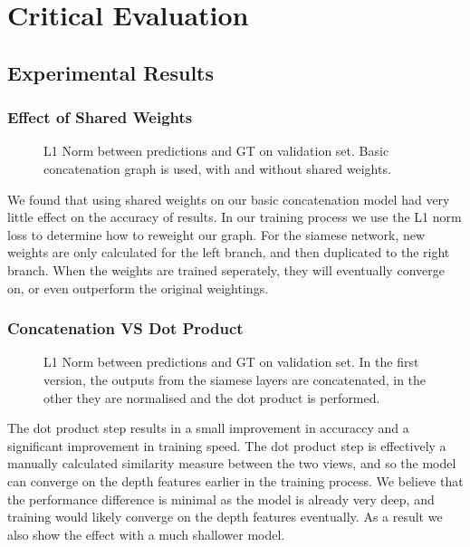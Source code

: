 \documentclass[ %
                    author={Gavin Parker},
                supervisor={Dr. Neill Campbell},
                    degree={MEng},
                     title={Deep Siamese Networks for Illumination Estimation from Stereo Images},
                  subtitle={},
                      type={research},
                      year={2018} ]{dissertation}
\begin{document}
\chapter{Critical Evaluation}
\label{chap:evaluation}
\section{Experimental Results}
\subsection{Effect of Shared Weights}
\begin{figure}[H]
\newlength\figureheight
\newlength\figurewidth
\setlength\figureheight{6cm}
\setlength\figurewidth{12cm}
\centering

\caption{L1 Norm between predictions and GT on validation set. Basic concatenation graph is used, with and without shared weights.}
\end{figure}
We found that using shared weights on our basic concatenation model had very little effect on the accuracy of results. In our training process we use the L1 norm loss to determine how to reweight our graph. For the siamese network, new weights are only calculated for the left branch, and then duplicated to the right branch. When the weights are trained seperately, they will eventually converge on, or even outperform the original weightings.
\subsection{Concatenation VS Dot Product}
\begin{figure}[H]
\setlength\figureheight{6cm}
\setlength\figurewidth{12cm}
\centering

\caption{L1 Norm between predictions and GT on validation set. In the first version, the outputs from the siamese layers are concatenated, in the other they are normalised and the dot product is performed.}
\end{figure}
The dot product step results in a small improvement in accuraccy and a significant improvement in training speed. The dot product step is effectively a manually calculated similarity measure between the two views, and so the model can converge on the depth features earlier in the training process. We believe that the performance difference is minimal as the model is already very deep, and training would likely converge on the depth features eventually. As a result we also show the effect with a much shallower model. 
\end{document}
